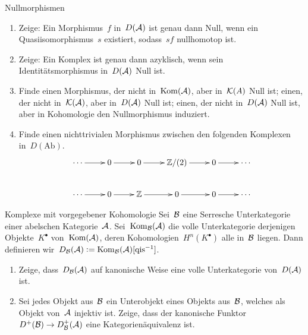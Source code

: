 \documentclass{uebblatt}
\begin{document}

\begin{aufgabe}{Nullmorphismen}
\begin{enumerate}
\item Zeige: Ein Morphismus~$f$ in~$D(\mathcal{A})$ ist genau dann Null, wenn ein
Quasiisomorphismus~$s$ existiert, sodass~$sf$ nullhomotop ist.
\item Zeige: Ein Komplex ist genau dann azyklisch, wenn sein
Identitätsmorphismus in~$D(\mathcal{A})$ Null ist.
\item Finde einen Morphismus, der nicht in~$\mathrm{Kom}(\mathcal{A})$, aber in~$\mathcal{K}(A)$ Null
ist; einen, der nicht in~$\mathcal{K}(\mathcal{A})$, aber in~$D(\mathcal{A})$ Null ist; einen, der nicht
in~$D(\mathcal{A})$ Null ist, aber in Kohomologie den Nullmorphismus induziert.
\item Finde einen nichttrivialen Morphismus zwischen den folgenden Komplexen
in~$D(\mathrm{Ab})$.
\[ \xymatrix{
  \cdots \ar[r] & 0 \ar[r] & 0 \ar[r] & \ZZ/(2) \ar[r] & 0 \ar[r] & \cdots \\
  \cdots \ar[r] & 0 \ar[r] & \ZZ \ar[r] & 0 \ar[r] & 0 \ar[r] & \cdots
} \]
\end{enumerate}
\end{aufgabe}

\begin{aufgabe}{Komplexe mit vorgegebener Kohomologie}
Sei~$\mathcal{B}$ eine Serresche Unterkategorie einer abelschen Kategorie~$\mathcal{A}$.
Sei~$\mathrm{Kom}_{\mathcal{B}}(\mathcal{A})$ die volle Unterkategorie derjenigen Objekte~$K^\bullet$
von~$\mathrm{Kom}(\mathcal{A})$, deren Kohomologien~$H^n(K^\bullet)$ alle in~$\mathcal{B}$ liegen.
Dann definieren wir~$D_{\mathcal{B}}(\mathcal{A}) \vcentcolon= \mathrm{Kom}_{\mathcal{B}}(\mathcal{A})[\text{qis}^{-1}]$.
\begin{enumerate}
\item Zeige, dass~$D_{\mathcal{B}}(\mathcal{A})$ auf kanonische Weise eine volle
Unterkategorie von~$D(\mathcal{A})$ ist.
\item Sei jedes Objekt aus~$\mathcal{B}$ ein Unterobjekt eines Objekts aus~$\mathcal{B}$, welches
als Objekt von~$\mathcal{A}$ injektiv ist. Zeige, dass der kanonische Funktor~$D^+(\mathcal{B})
\to D^+_{\mathcal{B}}(\mathcal{A})$ eine Kategorienäquivalenz ist.
\end{enumerate}
\end{aufgabe}
\end{document}
